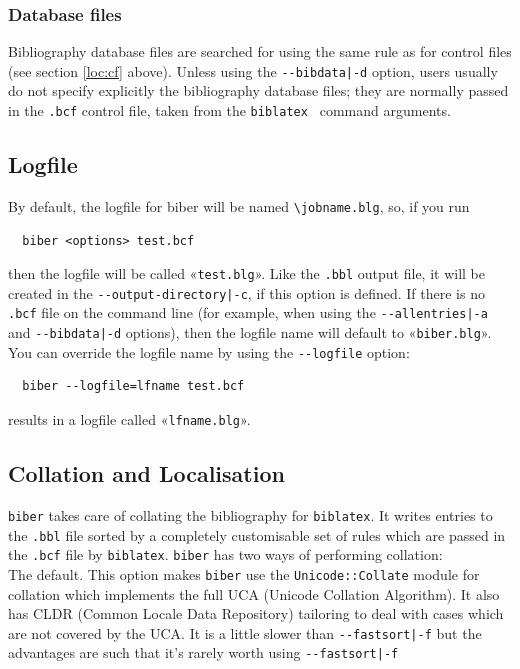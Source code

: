 \documentclass{ltxdockit}
\def\biberex#1{\hbox{\hspace{-4em}\texttt{\small \detokenize{#1}}}}
\begin{document}
\subsubsection{Database files}

Bibliography database files are searched for using the same rule as for
control files (see section \ref{loc:cf} above). Unless using the
\verb+--bibdata|-d+ option, users usually do not specify explicitly the
bibliography database files; they are normally passed in the \verb+.bcf+
control file, taken from the \verb+biblatex + \verb++
command arguments.

\subsection{Logfile}

By default, the logfile for biber will be named \verb+\jobname.blg+,
so, if you run

\begin{verbatim}
  biber <options> test.bcf
\end{verbatim}

\noindent then the logfile will be called «\verb+test.blg+». Like the
\verb+.bbl+ output file, it will be created in the
\verb+--output-directory|-c+, if this option is defined. If there is
no \verb+.bcf+ file on the command line (for example, when using the
\verb+--allentries|-a+ and \verb+--bibdata|-d+ options), then the
logfile name will default to «\verb+biber.blg+». You can
override the logfile name by using the \verb+--logfile+ option:

\begin{verbatim}
  biber --logfile=lfname test.bcf
\end{verbatim}

\noindent results in a logfile called «\verb+lfname.blg+».

\subsection{Collation and Localisation}\label{coll}

\verb+biber+ takes care of collating the bibliography for
\verb+biblatex+. It writes entries to the \verb+.bbl+ file sorted by a
completely customisable set of rules which are passed in the
\verb+.bcf+ file by \verb+biblatex+. \verb+biber+ has two ways of performing
collation:\\[2ex]

\biberex{--collate|-C}
  \noindent The default. This option makes \verb+biber+ use the
  \verb+Unicode::Collate+ module for collation which implements the full UCA (Unicode
  Collation Algorithm). It also has CLDR (Common Locale Data
  Repository) tailoring to deal with cases which are not covered by the
  UCA. It is a little slower than \verb+--fastsort|-f+ but the
  advantages are such that it's rarely worth using \verb+--fastsort|-f+\\[1ex]
\end{document}
